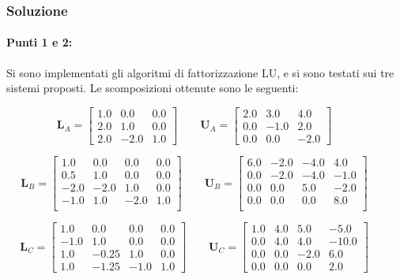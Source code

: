 \documentclass[letterpaper, 12pt]{article}
\numberwithin{equation}{section}    %
\begin{document}
\subsubsection{Soluzione}
\paragraph{Punti 1 e 2:} Si sono implementati gli algoritmi di fattorizzazione LU, e si sono testati 
sui tre sistemi proposti. Le scomposizioni ottenute sono le seguenti: 
\begin{center}
    \[
    \mathbf{L}_A =
    \begin{bmatrix}
    1.0  & 0.0 & 0.0 \\
    2.0  & 1.0 & 0.0 \\
    2.0  & -2.0 & 1.0
    \end{bmatrix}
    \qquad
    \mathbf{U}_A =
    \begin{bmatrix}
    2.0 &  3.0  & 4.0 \\
    0.0  & -1.0  & 2.0 \\
    0.0  & 0.0   & -2.0
    \end{bmatrix}
    \qquad
    \]

    \[
    \mathbf{L}_B =
    \begin{bmatrix}
    1.0  & 0.0   & 0.0  & 0.0 \\
    0.5  & 1.0   & 0.0  & 0.0 \\
    -2.0  & -2.0  & 1.0  & 0.0 \\
    -1.0  & 1.0   & -2.0 & 1.0 \\
    \end{bmatrix}
    \qquad
    \mathbf{U}_B =
    \begin{bmatrix}
    6.0  & -2.0  & -4.0  & 4.0  \\
    0.0  & -2.0  & -4.0  & -1.0 \\
    0.0  & 0.0   & 5.0   & -2.0 \\
    0.0  & 0.0   & 0.0   & 8.0  \\
    \end{bmatrix}
    \qquad
    \]

    \[
    \mathbf{L}_C =
    \begin{bmatrix}
    1.0  & 0.0   & 0.0  & 0.0 \\
    -1.0  & 1.0   & 0.0  & 0.0 \\
    1.0  & -0.25 & 1.0  & 0.0 \\
    1.0  & -1.25 & -1.0 & 1.0 
    \end{bmatrix}
    \qquad
    \mathbf{U}_C =
    \begin{bmatrix}
    1.0  & 4.0   & 5.0  & -5.0 \\
    0.0  & 4.0   & 4.0  & -10.0 \\
    0.0  & 0.0   & -2.0 & 6.0 \\
    0.0  & 0.0   & 0.0  & 2.0 
    \end{bmatrix}
    \qquad
    \]
\end{center}
\end{document}
